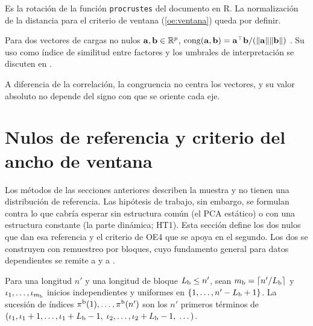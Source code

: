 Es la rotación de la función \texttt{procrustes} del documento en R. La normalización de la
distancia para el criterio de ventana (\cref{oe:ventana}) queda por definir.

\begin{definicion}\label{def:tucker}
Para dos vectores de cargas no nulos $\mathbf{a},\mathbf{b}\in\mathbb{R}^{p}$,
$\operatorname{cong}(\mathbf{a},\mathbf{b})=\mathbf{a}^{\top}\mathbf{b}/(\lVert \mathbf{a}\rVert\lVert \mathbf{b}\rVert)$
\parencite{tucker_1951}. Su uso como índice de
similitud entre factores y los umbrales de interpretación se discuten en
\textcite{lorenzo_seva_ten_berge_2006}.
\end{definicion}

A diferencia de la correlación, la congruencia no centra los vectores, y su valor absoluto no
depende del signo con que se oriente cada eje.

\section{Nulos de referencia y criterio del ancho de ventana}
\label{sec:nulos}

Los métodos de las secciones anteriores describen la muestra y no tienen una distribución de
referencia. Las hipótesis de trabajo, sin embargo, se formulan contra lo que cabría esperar sin
estructura común (el PCA estático) o con una estructura constante (la parte dinámica; HT1). Esta
sección define los dos nulos que dan esa referencia y el criterio de OE4 que se apoya en el
segundo. Los dos se construyen con remuestreo por bloques, cuyo fundamento general para datos
dependientes se remite a \textcite{kunsch_1989} y a
\textcite{lahiri_2003}.

\begin{definicion}\label{def:bloques}
Para una longitud $n'$ y una longitud de bloque $L_{\mathrm{b}}\le n'$, sean $m_{\mathrm{b}}=\lceil n'/L_{\mathrm{b}}\rceil$ y
$\iota_1,\dots,\iota_{m_{\mathrm{b}}}$ inicios independientes y uniformes en $\{1,\dots,n'-L_{\mathrm{b}}+1\}$. La sucesión de
índices $\pi^{\mathrm{b}}(1),\dots,\pi^{\mathrm{b}}(n')$ son los $n'$ primeros términos de
$(\iota_1,\iota_1+1,\dots,\iota_1+L_{\mathrm{b}}-1,\;\iota_2,\dots,\iota_2+L_{\mathrm{b}}-1,\;\dots)$.
\end{definicion}


